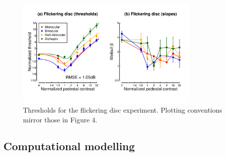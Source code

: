 \documentclass[
  letterpaper,
  DIV=11,
  numbers=noendperiod]{scrartcl}
\begin{document}
\begin{figure}

{\centering \includegraphics[width=0.8\textwidth,height=\textheight]{Figures/discdata.pdf}

}

\caption{\label{fig-discdata}Thresholds for the flickering disc
experiment. Plotting conventions mirror those in Figure 4.}

\end{figure}

\hypertarget{computational-modelling}{%
\subsection{Computational modelling}\label{computational-modelling}}
\end{document}
